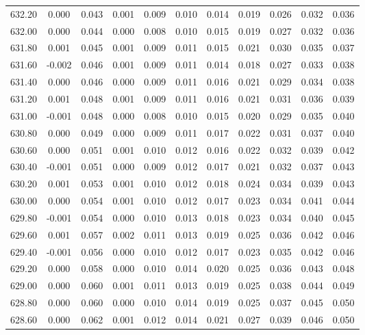 \begin{longtable}{cccccccccc}
    632.20 &  0.000 &  0.043 &  0.001 &  0.009 &  0.010 &  0.014 &  0.019 &  0.026 &  0.032 &  0.036 \\
    632.00 &  0.000 &  0.044 &  0.000 &  0.008 &  0.010 &  0.015 &  0.019 &  0.027 &  0.032 &  0.036 \\
    631.80 &  0.001 &  0.045 &  0.001 &  0.009 &  0.011 &  0.015 &  0.021 &  0.030 &  0.035 &  0.037 \\
    631.60 & -0.002 &  0.046 &  0.001 &  0.009 &  0.011 &  0.014 &  0.018 &  0.027 &  0.033 &  0.038 \\
    631.40 &  0.000 &  0.046 &  0.000 &  0.009 &  0.011 &  0.016 &  0.021 &  0.029 &  0.034 &  0.038 \\
    631.20 &  0.001 &  0.048 &  0.001 &  0.009 &  0.011 &  0.016 &  0.021 &  0.031 &  0.036 &  0.039 \\
    631.00 & -0.001 &  0.048 &  0.000 &  0.008 &  0.010 &  0.015 &  0.020 &  0.029 &  0.035 &  0.040 \\
    630.80 &  0.000 &  0.049 &  0.000 &  0.009 &  0.011 &  0.017 &  0.022 &  0.031 &  0.037 &  0.040 \\
    630.60 &  0.000 &  0.051 &  0.001 &  0.010 &  0.012 &  0.016 &  0.022 &  0.032 &  0.039 &  0.042 \\
    630.40 & -0.001 &  0.051 &  0.000 &  0.009 &  0.012 &  0.017 &  0.021 &  0.032 &  0.037 &  0.043 \\
    630.20 &  0.001 &  0.053 &  0.001 &  0.010 &  0.012 &  0.018 &  0.024 &  0.034 &  0.039 &  0.043 \\
    630.00 &  0.000 &  0.054 &  0.001 &  0.010 &  0.012 &  0.017 &  0.023 &  0.034 &  0.041 &  0.044 \\
    629.80 & -0.001 &  0.054 &  0.000 &  0.010 &  0.013 &  0.018 &  0.023 &  0.034 &  0.040 &  0.045 \\
    629.60 &  0.001 &  0.057 &  0.002 &  0.011 &  0.013 &  0.019 &  0.025 &  0.036 &  0.042 &  0.046 \\
    629.40 & -0.001 &  0.056 &  0.000 &  0.010 &  0.012 &  0.017 &  0.023 &  0.035 &  0.042 &  0.046 \\
    629.20 &  0.000 &  0.058 &  0.000 &  0.010 &  0.014 &  0.020 &  0.025 &  0.036 &  0.043 &  0.048 \\
    629.00 &  0.000 &  0.060 &  0.001 &  0.011 &  0.013 &  0.019 &  0.025 &  0.038 &  0.044 &  0.049 \\
    628.80 &  0.000 &  0.060 &  0.000 &  0.010 &  0.014 &  0.019 &  0.025 &  0.037 &  0.045 &  0.050 \\
    628.60 &  0.000 &  0.062 &  0.001 &  0.012 &  0.014 &  0.021 &  0.027 &  0.039 &  0.046 &  0.050 \\

\end{longtable}
